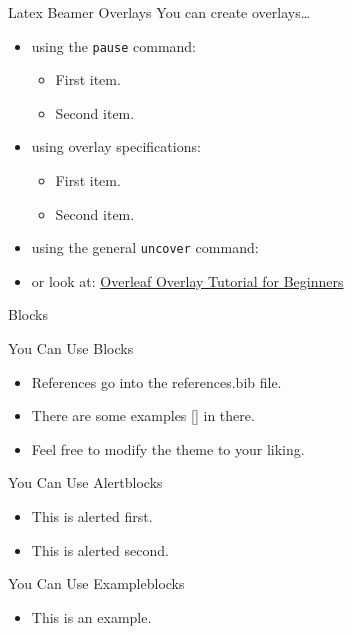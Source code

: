 \documentclass[aspectratio=1610,12pt]{beamer}
\begin{document}
\begin{frame}{Latex Beamer Overlays}
  You can create overlays\dots
  \begin{itemize}
    \item using the \texttt{pause} command:
    \begin{itemize}
      \item First item.
      \pause
      \item Second item.
    \end{itemize}
    \item using overlay specifications:
    \begin{itemize}
      \item<3-> First item.
      \item<4-> Second item.
    \end{itemize}
    \item using the general \texttt{uncover} command:
    \begin{itemize}
    \end{itemize}
    \item<7-> or look at: \href{https://www.overleaf.com/learn/latex/Beamer_Presentations\%3A_A_Tutorial_for_Beginners_(Part_4)\%E2\%80\%94Overlay_Specifications}{Overleaf Overlay Tutorial for Beginners} \end{itemize}
\end{frame}


\begin{frame}{Blocks}
  \begin{block}{You Can Use Blocks}
    \begin{itemize}
      \item References go into the references.bib file.
      \item There are some examples [\cite{biblatex,einstein}] in there.
      \item Feel free to modify the theme to your liking.
    \end{itemize}
  \end{block}
  \begin{alertblock}{You Can Use Alertblocks}
    \begin{itemize}
      \item<alert@1> This is alerted first.
      \item<alert@2> This is alerted second.
    \end{itemize}
  \end{alertblock}
  \begin{exampleblock}{You Can Use Exampleblocks}
    \begin{itemize}
      \item This is an example.
    \end{itemize}
  \end{exampleblock}
\end{frame}
\end{document}
